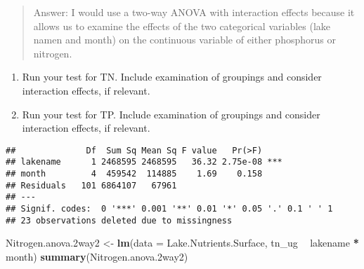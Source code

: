 \documentclass[]{article}
\newenvironment{Shaded}{\begin{snugshade}}{\end{snugshade}}
\newcommand{\CommentTok}[1]{\textcolor[rgb]{0.56,0.35,0.01}{\textit{#1}}}
\newcommand{\DataTypeTok}[1]{\textcolor[rgb]{0.13,0.29,0.53}{#1}}
\newcommand{\FloatTok}[1]{\textcolor[rgb]{0.00,0.00,0.81}{#1}}
\newcommand{\KeywordTok}[1]{\textcolor[rgb]{0.13,0.29,0.53}{\textbf{#1}}}
\newcommand{\NormalTok}[1]{#1}
\newcommand{\OperatorTok}[1]{\textcolor[rgb]{0.81,0.36,0.00}{\textbf{#1}}}
\newcommand{\StringTok}[1]{\textcolor[rgb]{0.31,0.60,0.02}{#1}}
\begin{document}
\begin{quote}
Answer: I would use a two-way ANOVA with interaction effects because it
allows us to examine the effects of the two categorical variables (lake
namen and month) on the continuous variable of either phosphorus or
nitrogen.
\end{quote}

\begin{enumerate}
\def\labelenumi{\arabic{enumi}.}
\setcounter{enumi}{4}
\item
  Run your test for TN. Include examination of groupings and consider
  interaction effects, if relevant.
\item
  Run your test for TP. Include examination of groupings and consider
  interaction effects, if relevant.
\end{enumerate}

\begin{Shaded}
\end{Shaded}

\begin{verbatim}
##              Df  Sum Sq Mean Sq F value   Pr(>F)    
## lakename      1 2468595 2468595   36.32 2.75e-08 ***
## month         4  459542  114885    1.69    0.158    
## Residuals   101 6864107   67961                     
## ---
## Signif. codes:  0 '***' 0.001 '**' 0.01 '*' 0.05 '.' 0.1 ' ' 1
## 23 observations deleted due to missingness
\end{verbatim}

\begin{Shaded}
\begin{Highlighting}[]
\NormalTok{Nitrogen.anova}\FloatTok{.2}\NormalTok{way2 <-}\StringTok{ }\KeywordTok{lm}\NormalTok{(}\DataTypeTok{data =}\NormalTok{ Lake.Nutrients.Surface, tn_ug }\OperatorTok{~}\StringTok{ }\NormalTok{lakename }\OperatorTok{*}\StringTok{ }\NormalTok{month)}
\KeywordTok{summary}\NormalTok{(Nitrogen.anova}\FloatTok{.2}\NormalTok{way2)}
\end{Highlighting}
\end{Shaded}
\end{document}
